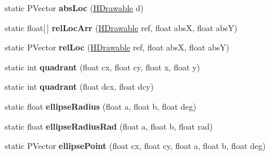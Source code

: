 \begin{DoxyCompactItemize}
\item 
\hypertarget{classhype_1_1core_1_1util_1_1_h_math_ae5052ec9e1fa853477f2e37491eea544}{static P\-Vector {\bfseries abs\-Loc} (\hyperlink{classhype_1_1core_1_1drawable_1_1_h_drawable}{H\-Drawable} d)}\label{classhype_1_1core_1_1util_1_1_h_math_ae5052ec9e1fa853477f2e37491eea544}

\item 
\hypertarget{classhype_1_1core_1_1util_1_1_h_math_a1965f9968010baa8b149963972aa9f84}{static float\mbox{[}$\,$\mbox{]} {\bfseries rel\-Loc\-Arr} (\hyperlink{classhype_1_1core_1_1drawable_1_1_h_drawable}{H\-Drawable} ref, float abs\-X, float abs\-Y)}\label{classhype_1_1core_1_1util_1_1_h_math_a1965f9968010baa8b149963972aa9f84}

\item 
\hypertarget{classhype_1_1core_1_1util_1_1_h_math_a21e95f5fc932d95e55cece7e2e5ffb7f}{static P\-Vector {\bfseries rel\-Loc} (\hyperlink{classhype_1_1core_1_1drawable_1_1_h_drawable}{H\-Drawable} ref, float abs\-X, float abs\-Y)}\label{classhype_1_1core_1_1util_1_1_h_math_a21e95f5fc932d95e55cece7e2e5ffb7f}

\item 
\hypertarget{classhype_1_1core_1_1util_1_1_h_math_adeb85acc1a48f1b161ed6b43cd23202b}{static int {\bfseries quadrant} (float cx, float cy, float x, float y)}\label{classhype_1_1core_1_1util_1_1_h_math_adeb85acc1a48f1b161ed6b43cd23202b}

\item 
\hypertarget{classhype_1_1core_1_1util_1_1_h_math_ab1ef30cca94b78a3acd30e6680304838}{static int {\bfseries quadrant} (float dcx, float dcy)}\label{classhype_1_1core_1_1util_1_1_h_math_ab1ef30cca94b78a3acd30e6680304838}

\item 
\hypertarget{classhype_1_1core_1_1util_1_1_h_math_af5cf1b410cb4098b00c196d033e63ecd}{static float {\bfseries ellipse\-Radius} (float a, float b, float deg)}\label{classhype_1_1core_1_1util_1_1_h_math_af5cf1b410cb4098b00c196d033e63ecd}

\item 
\hypertarget{classhype_1_1core_1_1util_1_1_h_math_a1af453ac9a1795fb2aa65d9f018f20d4}{static float {\bfseries ellipse\-Radius\-Rad} (float a, float b, float rad)}\label{classhype_1_1core_1_1util_1_1_h_math_a1af453ac9a1795fb2aa65d9f018f20d4}

\item 
\hypertarget{classhype_1_1core_1_1util_1_1_h_math_ac41a82468341db7707f35842d434ca94}{static P\-Vector {\bfseries ellipse\-Point} (float cx, float cy, float a, float b, float deg)}\label{classhype_1_1core_1_1util_1_1_h_math_ac41a82468341db7707f35842d434ca94}


\end{DoxyCompactItemize}
